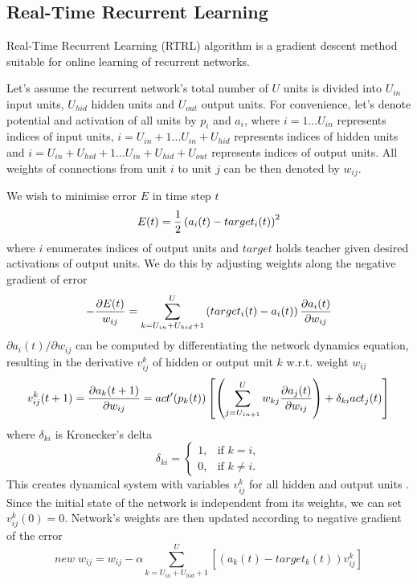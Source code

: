 \documentclass[12pt,oneside]{fithesis2}
\begin{document}
\subsection{Real-Time Recurrent Learning}
Real-Time Recurrent Learning (RTRL) algorithm is a gradient descent method suitable for online learning of recurrent networks.\par

Let's assume the recurrent network's total number of $U$ units is divided into $U_{in}$ input units, $U_{hid}$ hidden units and $U_{out}$ output units. For convenience, let's denote potential and activation of all units by $p_i$ and $a_i$, where $i=1 \dots U_{in}$ represents indices of input units, $i=U_{in} + 1 \dots U_{in} + U_{hid}$ represents indices of hidden units and $i=U_{in} + U_{hid} + 1 \dots U_{in} + U_{hid} + U_{out}$ represents indices of output units. All weights of connections from unit $i$ to unit $j$ can be then denoted by $w_{ij}$.\par

We wish to minimise error $E$ in time step $t$ %
$$E(t) = {1 \over 2}\left(a_i(t) - target_i(t)\right)^2$$
where $i$ enumerates indices of output units and $target$ holds teacher given desired activations of output units. We do this by adjusting weights along the negative gradient of error
$$-{{\partial E(t)} \over {w_{ij}}} = \sum\limits_{k=U_{in}+U_{hid}+1}^U \left( target_i(t) - a_i(t) \right) {{\partial a_i(t)} \over {\partial w_{ij}}}$$
${\partial a_i(t)} / {\partial w_{ij}}$ can be computed by differentiating the network dynamics equation, resulting in the derivative $v^k_{ij}$ of hidden or output unit $k$ w.r.t. weight $w_{ij}$
$$ v^k_{ij}(t+1) = {{\partial a_k(t+1)} \over {\partial w_{ij}}} = act'(p_k(t)) \left[ \left(\sum\limits_{j=U_{in+1}}^{U}  w_{kj} {{\partial a_j(t)} \over {\partial w_{ij}}}\right) + \delta_{ki} act_j(t) \right] $$
where $\delta_{ki}$ is Kronecker's delta
$$\delta_{ki} =
    \begin{cases}
            1, &         \text{if } k=i,\\
            0, &         \text{if } k\neq i.
    \end{cases}$$
This creates dynamical system with variables $v^k_{ij}$ for all hidden and output units \cite{williams-zipser}. Since the initial state of the network is independent from its weights, we can set $v^k_{ij}(0) = 0$. Network's weights are then updated according to negative gradient of the error
$$new \; w_{ij} =  w_{ij} - \alpha \sum\limits_{k=U_{in}+U_{hid}+1}^U \left[ \left(a_k(t) - target_k(t) \right) v_{ij}^k \right]$$
\end{document}
